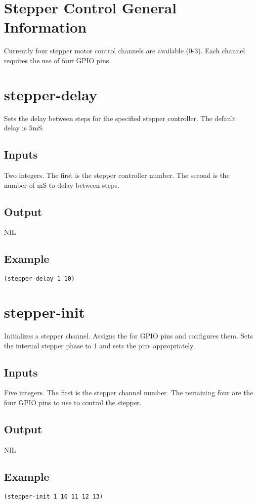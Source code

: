 \documentclass[10pt, openany]{book}
\begin{document}
\section{Stepper Control General Information}
Currently four stepper motor control channels are available (0-3).  Each channel requires the use of four GPIO pins.

\section{stepper-delay}
Sets the delay between steps for the specified stepper controller.  The default delay is 5mS.
\subsection{Inputs}
Two integers.  The first is the stepper controller number.  The second is the number of mS to delay between steps.
\subsection{Output}
NIL
\subsection{Example}
\begin{lstlisting}
(stepper-delay 1 10)
\end{lstlisting}

\section{stepper-init}
Initializes a stepper channel.  Assigns the for GPIO pins and configures them.  Sets the internal stepper phase to 1 and sets the pins appropriately.
\subsection{Inputs}
Five integers.  The first is the stepper channel number.  The remaining four are the four GPIO pins to use to control the stepper.
\subsection{Output}
NIL
\subsection{Example}
\begin{lstlisting}
(stepper-init 1 10 11 12 13)
\end{lstlisting}
\end{document}
